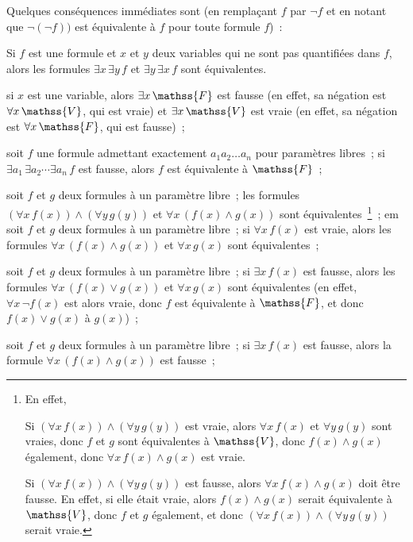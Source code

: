 Quelques conséquences immédiates sont (en remplaçant $f$ par $\lnot f$ et en notant que $\lnot (\lnot f))$ est équivalente à $f$ pour toute formule $f$) : 
\startitemize
  \item Si $f$ est une formule et $x$ et $y$ deux variables qui ne sont pas quantifiées dans $f$, alors les formules $\exists x \, \exists y \, f$ et $\exists y \, \exists x \, f$ sont équivalentes.
  \item si $x$ est une variable, alors $\exists x \, \mathss{F}$ est fausse (en effet, sa négation est $\forall x \, \mathss{V}$, qui est vraie) et $\exists x \, \mathss{V}$ est vraie (en effet, sa négation est $\forall x \, \mathss{F}$, qui est fausse) ; 
  \item soit $f$ une formule admettant exactement $a_1 a_2 \dots a_n$ pour paramètres libres ; si $\exists a_1 \, \exists a_2 \cdots \exists a_n \, f$ est fausse, alors $f$ est équivalente à $\mathss{F}$ ; 
  \item soit $f$ et $g$ deux formules à un paramètre libre ; les formules $(\forall x \, f(x)) \wedge (\forall y \, g(y))$ et $\forall x \, (f(x) \wedge g(x))$ sont équivalentes~\footnote{
       En effet, 
       \startitemize[nowhite]
         \item Si $(\forall x \, f(x)) \wedge (\forall y \, g(y))$ est vraie, alors $\forall x \, f(x)$ et $\forall y \, g(y)$ sont vraies, donc $f$ et $g$ sont équivalentes à $\mathss{V}$, donc $f(x) \wedge g(x)$ également, donc $\forall x \, f(x) \wedge g(x)$ est vraie.
         \item Si $(\forall x \, f(x)) \wedge (\forall y \, g(y))$ est fausse, alors $\forall x \, f(x) \wedge g(x)$ doit être fausse. 
             En effet, si elle était vraie, alors $f(x) \wedge g(x)$ serait équivalente à $\mathss{V}$, donc $f$ et $g$ également, et donc $(\forall x \, f(x)) \wedge (\forall y \, g(y))$ serait vraie.
       \stopitemize
   } ; 
  em soit $f$ et $g$ deux formules à un paramètre libre ; si $\forall x \, f(x)$ est vraie, alors les formules $\forall x \, (f(x) \wedge g(x))$ et $\forall x \, g(x)$ sont équivalentes ; 
  \item soit $f$ et $g$ deux formules à un paramètre libre ; si $\exists x \, f(x)$ est fausse, alors les formules $\forall x \, (f(x) \vee g(x))$ et $\forall x \, g(x)$ sont équivalentes (en effet, $\forall x \, \lnot f(x)$ est alors vraie, donc $f$ est équivalente à $\mathss{F}$, et donc $f(x) \vee g(x)$ à $g(x)$) ; 
  \item soit $f$ et $g$ deux formules à un paramètre libre ; si $\exists x \, f(x)$ est fausse, alors la formule $\forall x \, (f(x) \wedge g(x))$ est fausse ; 
